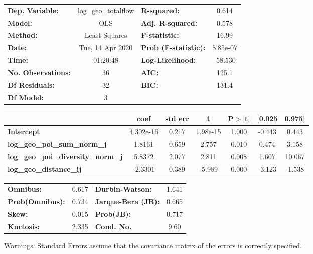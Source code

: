\begin{center}
\begin{tabular}{lclc}
\toprule
\textbf{Dep. Variable:}                    & log\_geo\_totalflow & \textbf{  R-squared:         } &     0.614   \\
\textbf{Model:}                            &         OLS         & \textbf{  Adj. R-squared:    } &     0.578   \\
\textbf{Method:}                           &    Least Squares    & \textbf{  F-statistic:       } &     16.99   \\
\textbf{Date:}                             &   Tue, 14 Apr 2020  & \textbf{  Prob (F-statistic):} &  8.85e-07   \\
\textbf{Time:}                             &       01:20:48      & \textbf{  Log-Likelihood:    } &   -58.530   \\
\textbf{No. Observations:}                 &            36       & \textbf{  AIC:               } &     125.1   \\
\textbf{Df Residuals:}                     &            32       & \textbf{  BIC:               } &     131.4   \\
\textbf{Df Model:}                         &             3       & \textbf{                     } &             \\
\bottomrule
\end{tabular}
\begin{tabular}{lcccccc}
                                           & \textbf{coef} & \textbf{std err} & \textbf{t} & \textbf{P$> |$t$|$} & \textbf{[0.025} & \textbf{0.975]}  \\
\midrule
\textbf{Intercept}                         &    4.302e-16  &        0.217     &  1.98e-15  &         1.000        &       -0.443    &        0.443     \\
\textbf{log\_geo\_poi\_sum\_norm\_j}       &       1.8161  &        0.659     &     2.757  &         0.010        &        0.474    &        3.158     \\
\textbf{log\_geo\_poi\_diversity\_norm\_j} &       5.8372  &        2.077     &     2.811  &         0.008        &        1.607    &       10.067     \\
\textbf{log\_geo\_distance\_ij}            &      -2.3301  &        0.389     &    -5.989  &         0.000        &       -3.123    &       -1.538     \\
\bottomrule
\end{tabular}
\begin{tabular}{lclc}
\textbf{Omnibus:}       &  0.617 & \textbf{  Durbin-Watson:     } &    1.641  \\
\textbf{Prob(Omnibus):} &  0.734 & \textbf{  Jarque-Bera (JB):  } &    0.665  \\
\textbf{Skew:}          &  0.015 & \textbf{  Prob(JB):          } &    0.717  \\
\textbf{Kurtosis:}      &  2.335 & \textbf{  Cond. No.          } &     9.60  \\
\bottomrule
\end{tabular}
\end{center}

Warnings: \newline
 [1] Standard Errors assume that the covariance matrix of the errors is correctly specified.